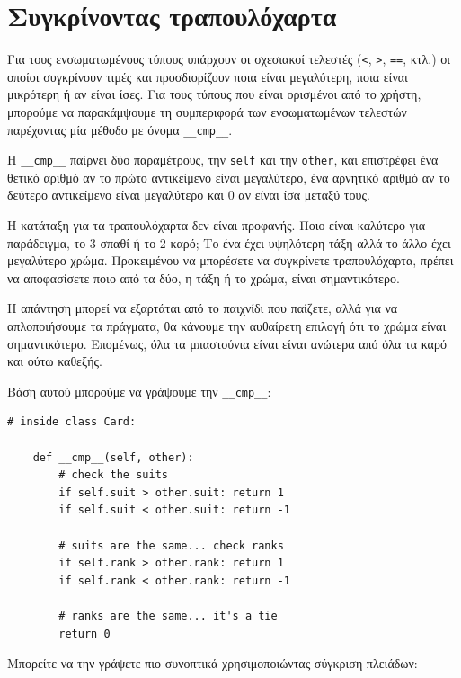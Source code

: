 \documentclass[10pt]{book}
\begin{document}
\section{Συγκρίνοντας τραπουλόχαρτα}
\label{comparecard}

Για τους ενσωματωμένους τύπους υπάρχουν οι σχεσιακοί τελεστές ({\tt <}, {\tt >}, {\tt ==}, κτλ.)
οι οποίοι συγκρίνουν τιμές και προσδιορίζουν ποια είναι μεγαλύτερη, ποια είναι μικρότερη ή αν είναι ίσες.
Για τους τύπους που είναι ορισμένοι από το χρήστη, μπορούμε να παρακάμψουμε τη συμπεριφορά των
ενσωματωμένων τελεστών παρέχοντας μία μέθοδο με όνομα \verb"__cmp__".

Η \verb"__cmp__" παίρνει δύο παραμέτρους, την {\tt self} και την {\tt other}, και επιστρέφει ένα θετικό
αριθμό αν το πρώτο αντικείμενο είναι μεγαλύτερο, ένα αρνητικό αριθμό αν το δεύτερο αντικείμενο είναι μεγαλύτερο
και 0 αν είναι ίσα μεταξύ τους.

Η κατάταξη για τα τραπουλόχαρτα δεν είναι προφανής. Ποιο είναι καλύτερο για παράδειγμα, το 3 σπαθί
ή το 2 καρό; Το ένα έχει υψηλότερη τάξη αλλά το άλλο έχει μεγαλύτερο χρώμα. Προκειμένου να μπορέσετε
να συγκρίνετε τραπουλόχαρτα, πρέπει να αποφασίσετε ποιο από τα δύο, η τάξη ή το χρώμα, είναι σημαντικότερο.

Η απάντηση μπορεί να εξαρτάται από το παιχνίδι που παίζετε, αλλά για να απλοποιήσουμε  
τα πράγματα, θα κάνουμε την αυθαίρετη επιλογή ότι το χρώμα είναι σημαντικότερο. Επομένως, όλα 
τα μπαστούνια είναι είναι ανώτερα από όλα τα καρό και ούτω καθεξής.

Βάση αυτού μπορούμε να γράψουμε την \verb"__cmp__":

\begin{verbatim}
# inside class Card:

    def __cmp__(self, other):
        # check the suits
        if self.suit > other.suit: return 1
        if self.suit < other.suit: return -1

        # suits are the same... check ranks
        if self.rank > other.rank: return 1
        if self.rank < other.rank: return -1

        # ranks are the same... it's a tie
        return 0
\end{verbatim}
%
Μπορείτε να την γράψετε πιο συνοπτικά χρησιμοποιώντας σύγκριση πλειάδων:
\end{document}
